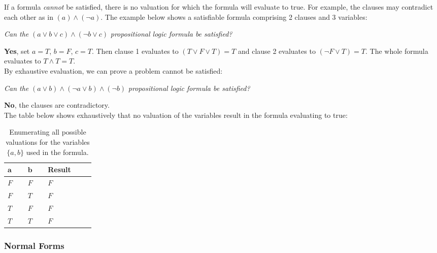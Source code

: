 \documentclass[a4paper,openany,12pt]{book}
\begin{document}
If a formula \emph{cannot} be satisfied, there is no valuation for which the formula will evaluate to true.
For example, the clauses may contradict each other as in $(a) \land (\neg a)$.
The example below shows a satisfiable formula comprising 2 clauses and 3 variables:

\emph{Can the} \(
    (a \lor b \lor c) \land (\neg b \lor c)
\) \emph{propositional logic formula be satisfied?}

\textcolor{id7-emerald-green}{\textbf{Yes}}, set $a = T$, $b=F$, $c=T$.
Then clause 1 evaluates to $(T \lor F \lor T) = T$ and clause 2 evaluates to $(\neg F \lor T) = T$.
The whole formula evaluates to $T \land T = T$.\\

By exhaustive evaluation, we can prove a problem cannot be satisfied:

\emph{Can the} \(
    (a \lor b) \land (\neg a \lor b) \land (\neg b)
\) \emph{propositional logic formula be satisfied?}

\textcolor{id7-ruby-red}{\textbf{No}}, the clauses are contradictory.\\
The table below shows exhaustively that no valuation of the variables result in the formula evaluating to true:

\begin{table}[H]
    \centering
    \begin{tabular}[t]{|p{0.05\linewidth}|p{0.05\linewidth}|p{0.1\linewidth}|}
        \hline
        \rowcolor{id7-aubergine}
        {\color[HTML]{FFFFFF} $\mathbf{a}$} & {\color[HTML]{FFFFFF} $\mathbf{b}$} & {\color[HTML]{FFFFFF} \sffamily  \textbf{Result}} \\ \hline
        $F$ & $F$ & $F$  \\ \hline
        $F$ & $T$ & $F$  \\ \hline
        $T$ & $F$ & $F$  \\ \hline
        $T$ & $T$ & $F$  \\ \hline
    \end{tabular}
    \caption{Enumerating all possible valuations for the variables $\{a, b\}$ used in the formula.}
    \label{table:landingredesign}
\end{table}

\subsubsection{Normal Forms}
\end{document}
